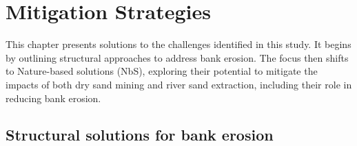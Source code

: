 \chapter{Mitigation Strategies}
\label{chap:mitigationstrats}
This chapter presents solutions to the challenges identified in this study. It begins by outlining structural approaches to address bank erosion. The focus then shifts to Nature-based solutions (NbS), exploring their potential to mitigate the impacts of both dry sand mining and river sand extraction, including their role in reducing bank erosion.

\section{Structural solutions for bank erosion}
\label{section_8.2}

